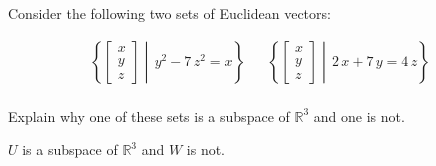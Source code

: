 
\begin{exerciseStatement}


Consider the following two sets of Euclidean vectors: 


\begin{align*}  \left\{ \left[\begin{array}{c}
x \\
y \\
z
\end{array}\right] \middle|\,y^{2} - 7 \, z^{2} = x\right\}  & &   \left\{ \left[\begin{array}{c}
x \\
y \\
z
\end{array}\right] \middle|\,2 \, x + 7 \, y = 4 \, z\right\}  \\ \end{align*}
            

 Explain why one of these sets is a subspace of \(\mathbb{R}^ 3 \) and one is not. 


\end{exerciseStatement}
    
\begin{exerciseAnswer} 


\(U\) is a subspace of \(\mathbb{R}^ 3 \) and \(W\) is not.


\end{exerciseAnswer}
    
